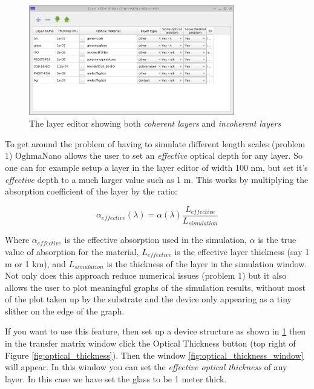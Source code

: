 \begin{figure}[H]
\centering
\includegraphics[width=0.8\textwidth,height=0.5\textwidth]{./images/transfer_matrix/layer_editor.png}
\caption{The layer editor showing both \emph{coherent layers} and \emph{incoherent layers}}
\label{fig:transfer_matrix_layer_editor}
\end{figure}

To get around the problem of having to simulate different length scales (problem 1) OghmaNano allows the user to set an \emph{effective} optical depth for any layer.  So one can for example setup a layer in the layer editor of width 100 nm, but set it's \emph{effective} depth to a much larger value such as 1 m. This works by multiplying the absorption coefficient of the layer by the ratio:

\begin{equation}
\alpha_{effective}(\lambda)=\alpha(\lambda) \frac{L_{effective}}{L_{simulation}}
\label{effective_depth}
\end{equation}

Where $\alpha_{effective}$ is the effective absorption used in the simulation, $\alpha$ is the true value of absorption for the material, $L_{effective}$ is the effective layer thickness (say 1 m or 1 km), and $L_{simulation}$ is the thickness of the layer in the simulation window. Not only does this approach reduce numerical issues (problem 1) but it also allows the user to plot meaningful graphs of the simulation results, without most of the plot taken up by the substrate and the device only appearing as a tiny slither on the edge of the graph.

If you want to use this feature, then set up a device structure as shown in \ref{fig:transfer_matrix_layer_editor} then in the transfer matrix window click the Optical Thickness button (top right of Figure \ref{fig:optical_thickness}). Then the window \ref{fig:optical_thickness_window} will appear. In this window you can set the \emph{effective optical thickness} of any layer. In this case we have set the glass to be 1 meter thick.

